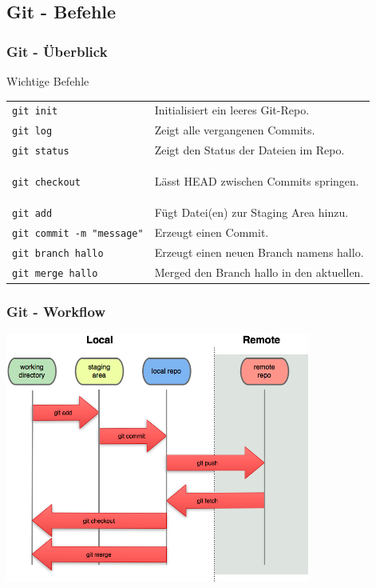 \documentclass[18pt]{beamer}
\begin{document}
	\subsection{Git - Befehle}
	\begin{frame}
		\frametitle{Git - Überblick}
		\begin{block}{Wichtige Befehle}
			\begin{tabular}{ll}
				\texttt{git init} &  Initialisiert ein leeres Git-Repo.\\
				\texttt{git log} &  Zeigt alle vergangenen Commits.\\
				\texttt{git status} &  Zeigt den Status der Dateien im Repo.\\
				\texttt{git checkout} & \begin{small}
					Lässt HEAD zwischen Commits springen. 
				\end{small}\\
				\texttt{git add} &  Fügt Datei(en) zur Staging Area hinzu.\\
				\texttt{git commit -m "message"} &  Erzeugt einen Commit.\\ 
				\texttt{git branch hallo} & Erzeugt einen neuen Branch namens hallo.\\
				\texttt{git merge hallo} & Merged den Branch hallo in den aktuellen. 
			\end{tabular}
		\end{block}
	\end{frame}

	\begin{frame}
		\frametitle{Git - Workflow}
		\centering \includegraphics[width=100mm, scale=1.3]{./pics/tut0/git-file-lifecycle.png}
\end{frame}
\end{document}
